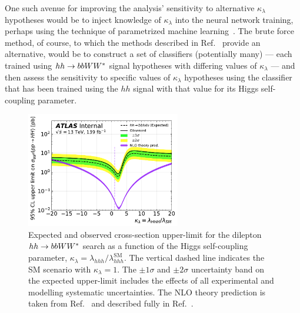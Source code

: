One such avenue for improving the analysis' sensitivity to alternative $\kappa_{\lambda}$ hypotheses would be
to inject knowledge of $\kappa_{\lambda}$ into the neural network training, perhaps using
the technique of parametrized machine learning~\cite{Baldi:2016fzo}.
The brute force method, of course, to which the methods described in Ref.~\cite{Baldi:2016fzo} provide an alternative, would be to construct a set of classifiers (potentially many) --- each trained using $hh \rightarrow bbWW^*$ signal hypotheses with differing values of $\kappa_{\lambda}$ ---
and then assess the sensitivity to specific values of $\kappa_{\lambda}$ hypotheses using
the classifier that has been trained using the $hh$ signal with that value for its Higgs self-coupling parameter.

\begin{figure}[!htb]
    \begin{center}
        \includegraphics[width=0.6\textwidth]{figures/search_hh/results/wwbb_lambda_scan_may7}
        \caption{
            Expected and observed cross-section upper-limit for the dilepton $hh \rightarrow bbWW^*$ search
            as a function of the Higgs self-coupling parameter, $\kappa_{\lambda} = \lambda_{hhh} / \lambda_{hhh}^{\text{SM}}$.
            The vertical dashed line indicates the SM scenario with $\kappa_{\lambda} = 1$.
            The $\pm 1\sigma$ and $\pm 2 \sigma$ uncertainty band on the expected upper-limit includes the effects
            of all experimental and modelling systematic uncertainties.
            The NLO theory prediction is taken from Ref.~\cite{deFlorian:2016spz} and described fully
            in Ref.~\cite{HHComb36}.
        }
        \label{fig:hh_lambda_scan}
    \end{center}
\end{figure}

